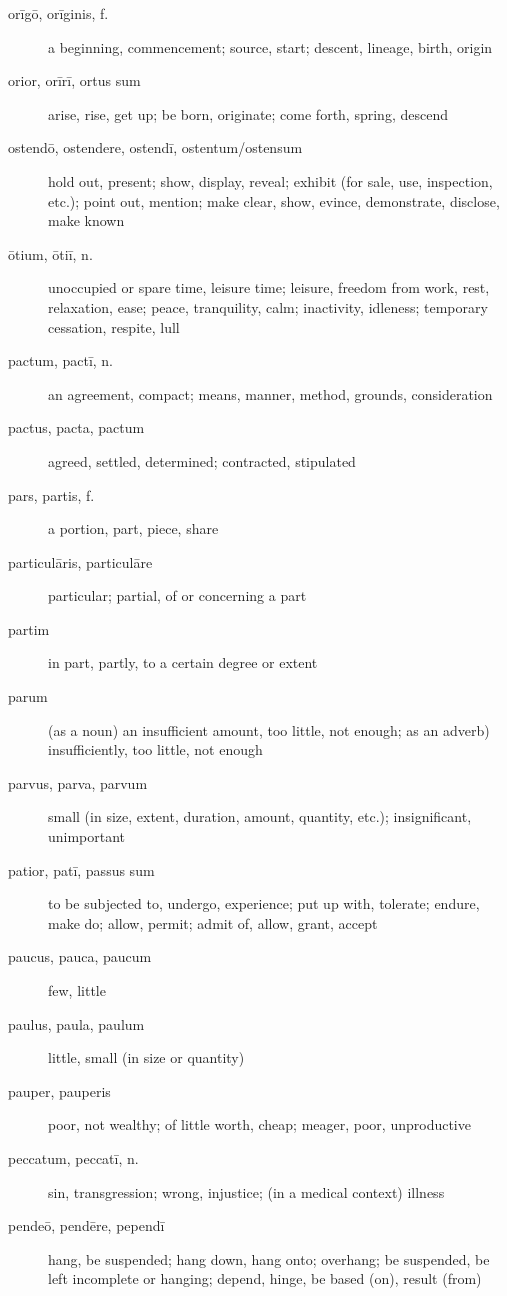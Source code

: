 \begin{description}
    \item[orīgō, orīginis, f.] a beginning, commencement; source, start; descent, lineage, birth, origin
    \item[orior, orīrī, ortus sum] arise, rise, get up; be born, originate; come forth, spring, descend
    \item[ostendō, ostendere, ostendī, ostentum/ostensum] \marginnote{*}hold out, present; show, display, reveal; exhibit (for sale, use, inspection, etc.); point out, mention; make clear, show, evince, demonstrate, disclose, make known
    \item[ōtium, ōtiī, n.] \marginnote{*}unoccupied or spare time, leisure time; leisure, freedom from work, rest, relaxation, ease; peace, tranquility, calm; inactivity, idleness; temporary cessation, respite, lull
    \item[pactum, pactī, n.] an agreement, compact; means, manner, method, grounds, consideration
    \item[pactus, pacta, pactum] agreed, settled, determined; contracted, stipulated
    \item[pars, partis, f.] \marginnote{*}a portion, part, piece, share
    \item[particulāris, particulāre] particular; partial, of or concerning a part
    \item[partim] in part, partly, to a certain degree or extent
    \item[parum] (as a noun) an insufficient amount, too little, not enough; as an adverb) insufficiently, too little, not enough
    \item[parvus, parva, parvum] \marginnote{*}small (in size, extent, duration, amount, quantity, etc.); insignificant, unimportant
    \item[patior, patī, passus sum] \marginnote{*}to be subjected to, undergo, experience; put up with, tolerate; endure, make do; allow, permit; admit of, allow, grant, accept
    \item[paucus, pauca, paucum] \marginnote{*}few, little
    \item[paulus, paula, paulum] \marginnote{*}little, small (in size or quantity)
    \item[pauper, pauperis] \marginnote{*}poor, not wealthy; of little worth, cheap; meager, poor, unproductive
    \item[peccatum, peccatī, n.] sin, transgression; wrong, injustice; (in a medical context) illness
    \item[pendeō, pendēre, pependī] hang, be suspended; hang down, hang onto; overhang; be suspended, be left incomplete or hanging; depend, hinge, be based (on), result (from)

\end{description}
